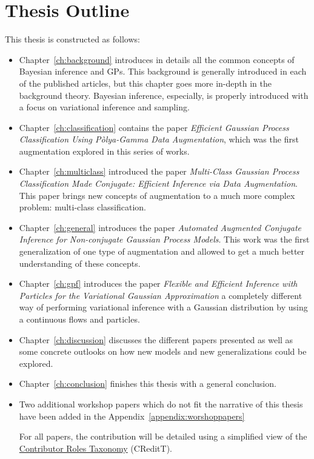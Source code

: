 \section{Thesis Outline}

This thesis is constructed as follows:
\begin{itemize}
    \item Chapter~\ref{ch:background} introduces in details all the common concepts of Bayesian inference and \ac{GPs}.
    This background is generally introduced in each of the published articles, but this chapter goes more in-depth in the background theory.
    Bayesian inference, especially, is properly introduced with a focus on variational inference and sampling.
    \item Chapter~\ref{ch:classification} contains the paper \textit{Efficient Gaussian Process Classification Using P\`olya-Gamma Data Augmentation}, which was the first augmentation explored in this series of works.
    \item Chapter~\ref{ch:multiclass} introduced the paper \textit{Multi-Class Gaussian Process Classification Made Conjugate: Efficient Inference via Data Augmentation}.
    This paper brings new concepts of augmentation to a much more complex problem: multi-class classification.
    \item Chapter~\ref{ch:general} introduces the paper \textit{Automated Augmented Conjugate Inference for Non-conjugate Gaussian Process Models}.
    This work was the first generalization of one type of augmentation and allowed to get a much better understanding of these concepts.
    \item Chapter~\ref{ch:gpf} introduces the paper \textit{Flexible and Efficient Inference with Particles for the Variational Gaussian Approximation } a completely different way of performing variational inference with a Gaussian distribution by using a continuous flows and particles.
    \item Chapter~\ref{ch:discussion} discusses the different papers presented as well as some concrete outlooks on how new models and new generalizations could be explored.
    \item Chapter~\ref{ch:conclusion} finishes this thesis with a general conclusion.
    \item Two additional workshop papers which do not fit the narrative of this thesis have been added in the Appendix~\ref{appendix:worshoppapers}

    For all papers, the contribution will be detailed using a simplified view of the \href{https://mdpi-res.com/data/contributor-role-instruction.pdf}{Contributor Roles Taxonomy} (CReditT).

\end{itemize}

